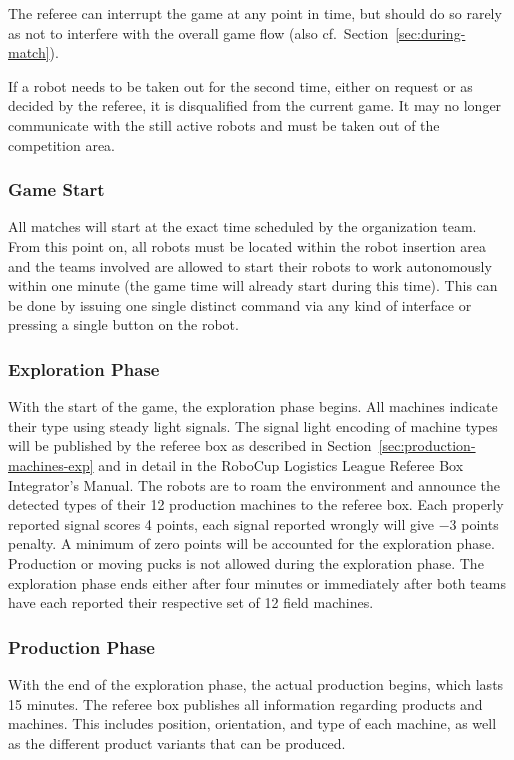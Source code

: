 \documentclass[12pt,twoside]{article}
\newcommand{\refsec}[1]{Section~\ref{#1}}
\begin{document}
The referee can interrupt the game at any point in time, but should do
so rarely as not to interfere with the overall game flow (also
cf.~\refsec{sec:during-match}).

If a robot needs to be taken out for the second time, either on
request or as decided by the referee, it is disqualified from the
current game. It may no longer communicate with the still active
robots and must be taken out of the competition area.

\subsubsection{Game Start}
\label{sec:game-start}
%
All matches will start at the exact time scheduled by the organization
team. From this point on, all robots must be located within the robot
insertion area and the teams involved are allowed to start their
robots to work autonomously within one minute (the game time will
already start during this time). This can be done by issuing one
single distinct command via any kind of interface or pressing a single
button on the robot.

\subsubsection{Exploration Phase}
\label{sec:expphase}
With the start of the game, the exploration phase begins. All machines
indicate their type using steady light signals. The signal light
encoding of machine types will be published by the referee box as
described in \refsec{sec:production-machines-exp} and in detail in the
RoboCup Logistics League Referee Box Integrator's Manual. The robots
are to roam the environment and announce the detected types of their
12 production machines to the referee box.  Each properly reported
signal scores \num{+4} points, each signal reported wrongly will give
\num{-3} points penalty. A minimum of zero points will be accounted
for the exploration phase. Production or moving pucks is not allowed
during the exploration phase.  The exploration phase ends either after
four minutes or immediately after both teams have each reported their
respective set of 12 field machines.

\subsubsection{Production Phase}
\label{sec:production-phase}
With the end of the exploration phase, the actual production begins,
which lasts \num{15} minutes. The referee box publishes all information
regarding products and machines. This includes position, orientation,
and type of each machine, as well as the different product variants
that can be produced.
\end{document}
